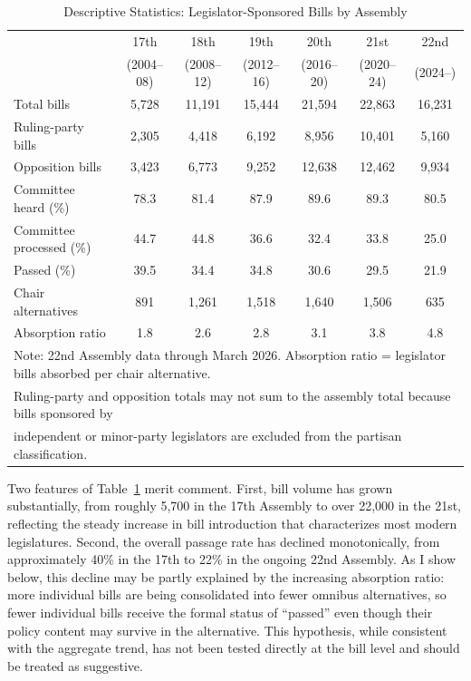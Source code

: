 \documentclass[11pt]{article}
\begin{document}
\begin{table}[H]
\centering
\caption{Descriptive Statistics: Legislator-Sponsored Bills by Assembly}
\label{tab:desc}
\begin{tabular}{lcccccc}
\toprule
 & 17th & 18th & 19th & 20th & 21st & 22nd \\
 & (2004--08) & (2008--12) & (2012--16) & (2016--20) & (2020--24) & (2024--) \\
\midrule
Total bills & 5,728 & 11,191 & 15,444 & 21,594 & 22,863 & 16,231 \\
Ruling-party bills & 2,305 & 4,418 & 6,192 & 8,956 & 10,401 & 5,160 \\
Opposition bills & 3,423 & 6,773 & 9,252 & 12,638 & 12,462 & 9,934 \\
Committee heard (\%) & 78.3 & 81.4 & 87.9 & 89.6 & 89.3 & 80.5 \\
Committee processed (\%) & 44.7 & 44.8 & 36.6 & 32.4 & 33.8 & 25.0 \\
Passed (\%) & 39.5 & 34.4 & 34.8 & 30.6 & 29.5 & 21.9 \\
Chair alternatives & 891 & 1,261 & 1,518 & 1,640 & 1,506 & 635 \\
Absorption ratio & 1.8 & 2.6 & 2.8 & 3.1 & 3.8 & 4.8 \\
\bottomrule
\multicolumn{7}{l}{\footnotesize Note: 22nd Assembly data through March 2026. Absorption ratio = legislator bills absorbed per chair alternative.} \\
\multicolumn{7}{l}{\footnotesize Ruling-party and opposition totals may not sum to the assembly total because bills sponsored by} \\
\multicolumn{7}{l}{\footnotesize independent or minor-party legislators are excluded from the partisan classification.} \\
\end{tabular}
\end{table}

Two features of Table~\ref{tab:desc} merit comment. First, bill volume has grown substantially, from roughly 5,700 in the 17th Assembly to over 22,000 in the 21st, reflecting the steady increase in bill introduction that characterizes most modern legislatures. Second, the overall passage rate has declined monotonically, from approximately 40\% in the 17th to 22\% in the ongoing 22nd Assembly. As I show below, this decline may be partly explained by the increasing absorption ratio: more individual bills are being consolidated into fewer omnibus alternatives, so fewer individual bills receive the formal status of ``passed'' even though their policy content may survive in the alternative. This hypothesis, while consistent with the aggregate trend, has not been tested directly at the bill level and should be treated as suggestive.
\end{document}
